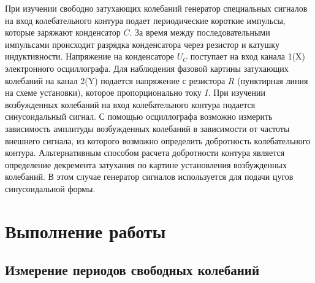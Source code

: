 \begin{figure}[H]
\centering
{}
\qquad
{}
\end{figure}
\n
При изучении свободно затухающих колебаний генератор специальных сигналов на вход колебательного контура подает периодические короткие импульсы, которые заряжают конденсатор $C$. За время между
последовательными импульсами происходит разрядка конденсатора через резистор и катушку индуктивности. Напряжение на конденсаторе $U_C$ поступает на вход канала 1(X) электронного осциллографа. Для наблюдения фазовой картины затухающих колебаний на канал 2(Y) подается напряжение с резистора $R$ (пунктирная линия на
схеме установки), которое пропорционально току $I$.
\n\n
При изучении возбужденных колебаний на вход колебательного контура подается синусоидальный сигнал. С помощью осциллографа возможно измерить зависимость амплитуды возбужденных колебаний в зависимости от частоты внешнего сигнала, из которого возможно определить добротность колебательного контура. Альтернативным способом расчета добротности контура является определение декремента затухания по картине установления возбужденных колебаний. В этом случае генератор сигналов используется для подачи цугов синусоидальной формы.

\section*{Выполнение работы}
\subsection*{Измерение периодов свободных колебаний}

